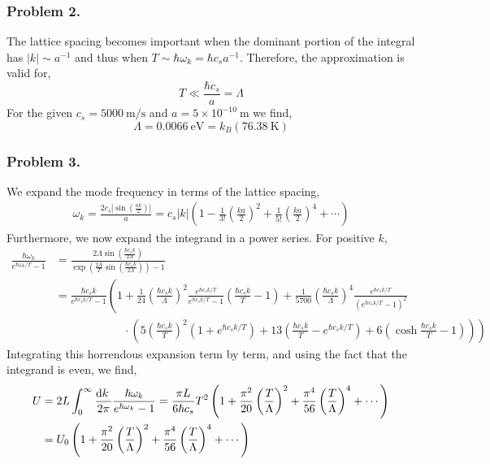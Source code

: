 \documentclass[12pt]{article}
\begin{document}
\subsubsection{Problem 2.}

The lattice spacing becomes important when the dominant portion of the integral has $|k| \sim a^{-1}$ and thus when $T \sim \hbar \omega_k = \hbar c_s a^{-1}$. Therefore, the approximation is valid for,
\[ T \ll \frac{ \hbar c_s}{a} = \Lambda \] 
For the given $c_s = 5000 \: \text{m/s}$ and $a =  5 \times 10^{-10} \: \text{m}$ we find,
\[ \Lambda = 0.0066 \: \text{eV} = k_B (76.38 \: \text{K}) \]

\subsubsection{Problem 3.}

We expand the mode frequency in terms of the lattice spacing,
\begin{align*}
\omega_k = \frac{2 c_s | \sin{(\frac{ak}{2})}|}{a} = c_s |k| \left( 1 - \frac{1}{3!} \left( \frac{k a}{2} \right)^2 + \frac{1}{5!} \left( \frac{ka}{2} \right)^4 + \cdots \right) 
\end{align*}
Furthermore, we now expand the integrand in a power series. For positive $k$,
\begin{align*}
\frac{ \hbar \omega_k}{e^{\hbar \omega_k / T} - 1} & = \frac{2 \Lambda \sin{(\frac{ \hbar c_s k}{2 \Lambda})}}{\exp{( \frac{2 \Lambda}{T} \sin{(\frac{\hbar c_s k}{2 \Lambda})})} - 1}
\\
& = \frac{ \hbar c_s k}{e^{\hbar c_s k / T} - 1} \left( 1 + \frac{1}{24} \left( \frac{\hbar c_s k}{\Lambda} \right)^2 \frac{e^{\hbar c_s k / T}}{e^{\hbar c_s k / T} - 1} \left( \frac{\hbar c_s k}{T} - 1 \right) + \frac{1}{5700} \left( \frac{\hbar c_s k}{\Lambda} \right)^4 \frac{e^{\hbar c_s k / T}}{(e^{\hbar c_s k / T} - 1)^2}
\right.
\\
& \left.  \quad \quad \quad \quad \quad \quad \cdot \left( 5 \left( \frac{\hbar c_s k}{T} \right)^2 \left( 1 + e^{\hbar c_s k / T} \right) + 13  \left( \frac{\hbar c_s k}{T} - e^{\hbar c_s k / T} \right) + 6 \left( \cosh{\frac{\hbar c_s k}{T}} - 1 \right)
\right)  \right)  
\end{align*}
Integrating this horrendous expansion term by term, and using the fact that the integrand is even, we find,
\begin{align*}
U & = 2L \int_0^{\infty} \frac{\mathrm{d}k \:}{2 \pi} \frac{\hbar \omega_k}{e^{\hbar \omega_k} - 1} = \frac{\pi L}{6 \hbar c_s} T^2 \left( 1 + \frac{\pi^2}{20} \left( \frac{T}{\Lambda} \right)^2 + \frac{\pi^4}{56} \left( \frac{T}{\Lambda} \right)^4 + \cdots \right) 
\\
& = U_0 \left( 1 + \frac{\pi^2}{20} \left( \frac{T}{\Lambda} \right)^2 + \frac{\pi^4}{56} \left( \frac{T}{\Lambda} \right)^4 + \cdots \right)
\end{align*}
\end{document}
